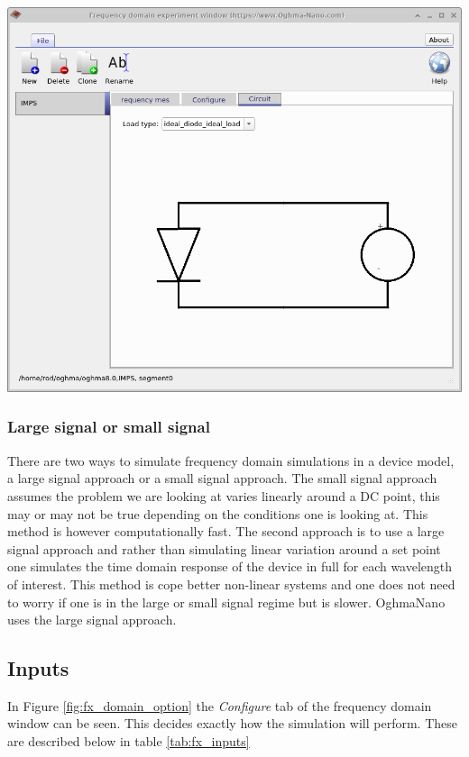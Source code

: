 \hspace{4pt}
\begin{minipage}[]{0.5\linewidth}
	\centering
	\includegraphics[width=\linewidth,height=0.8\linewidth]{./images/sim_editors/fx_domain_circuit.png}
	\label{fig:fx_domain_circuit}
\end{minipage}

\subsubsection{Large signal or small signal}
There are two ways to simulate frequency domain simulations in a device model, a large signal approach or a small signal approach. The small signal approach assumes the problem we are looking at varies linearly around a DC point, this may or may not be true depending on the conditions one is looking at. This method is however computationally fast.  The second approach is to use a large signal approach and rather than simulating linear variation around a set point one simulates the time domain response of the device in full for each wavelength of interest.  This method is cope better non-linear systems and one does not need to worry if one is in the large or small signal regime but is slower.  OghmaNano uses the large signal approach.

\subsection{Inputs}
In Figure \ref{fig:fx_domain_option} the \emph{Configure} tab of the frequency domain window can be seen. This decides exactly how the simulation will perform. These are described below in table \ref{tab:fx_inputs}

